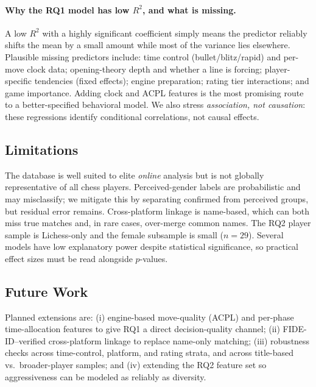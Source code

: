 \documentclass[11pt,a4paper]{article}
\begin{document}
\paragraph{Why the RQ1 model has low $R^2$, and what is missing.}
A low $R^2$ with a highly significant coefficient simply means the predictor reliably shifts
the mean by a small amount while most of the variance lies elsewhere. Plausible missing
predictors include: time control (bullet/blitz/rapid) and per-move clock data; opening-theory
depth and whether a line is forcing; player-specific tendencies (fixed effects); engine
preparation; rating tier interactions; and game importance. Adding clock and ACPL features is
the most promising route to a better-specified behavioral model. We also stress
\emph{association, not causation}: these regressions identify conditional correlations, not
causal effects.

\subsection{Limitations}
The database is well suited to elite \emph{online} analysis but is not globally
representative of all chess players. Perceived-gender labels are probabilistic and may
misclassify; we mitigate this by separating confirmed from perceived groups, but residual
error remains. Cross-platform linkage is name-based, which can both miss true matches and, in
rare cases, over-merge common names. The RQ2 player sample is Lichess-only and the female
subsample is small ($n=29$). Several models have low explanatory power despite statistical
significance, so practical effect sizes must be read alongside $p$-values.

\subsection{Future Work}
Planned extensions are: (i) engine-based move-quality (ACPL) and per-phase time-allocation
features to give RQ1 a direct decision-quality channel; (ii) FIDE-ID--verified cross-platform
linkage to replace name-only matching; (iii) robustness checks across time-control, platform,
and rating strata, and across title-based vs.\ broader-player samples; and (iv) extending the
RQ2 feature set so aggressiveness can be modeled as reliably as diversity.

\end{document}
